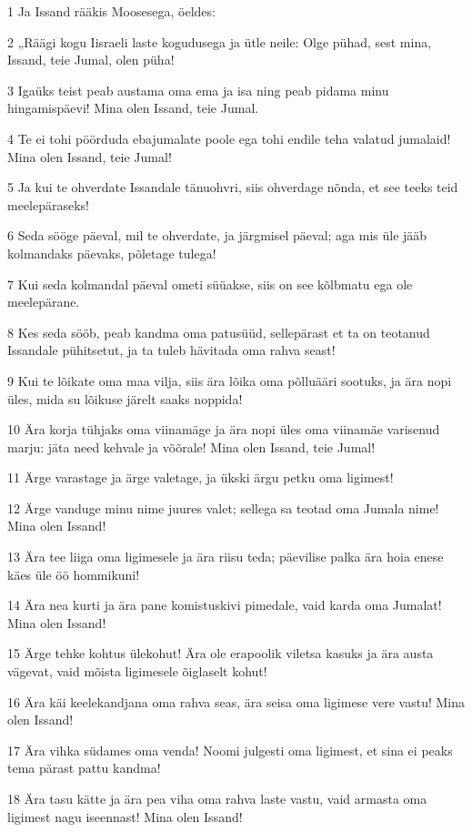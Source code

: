 \par 1 Ja Issand rääkis Moosesega, öeldes:
\par 2 „Räägi kogu Iisraeli laste kogudusega ja ütle neile: Olge pühad, sest mina, Issand, teie Jumal, olen püha!
\par 3 Igaüks teist peab austama oma ema ja isa ning peab pidama minu hingamispäevi! Mina olen Issand, teie Jumal.
\par 4 Te ei tohi pöörduda ebajumalate poole ega tohi endile teha valatud jumalaid! Mina olen Issand, teie Jumal!
\par 5 Ja kui te ohverdate Issandale tänuohvri, siis ohverdage nõnda, et see teeks teid meelepäraseks!
\par 6 Seda sööge päeval, mil te ohverdate, ja järgmisel päeval; aga mis üle jääb kolmandaks päevaks, põletage tulega!
\par 7 Kui seda kolmandal päeval ometi süüakse, siis on see kõlbmatu ega ole meelepärane.
\par 8 Kes seda sööb, peab kandma oma patusüüd, sellepärast et ta on teotanud Issandale pühitsetut, ja ta tuleb hävitada oma rahva seast!
\par 9 Kui te lõikate oma maa vilja, siis ära lõika oma põlluääri sootuks, ja ära nopi üles, mida su lõikuse järelt saaks noppida!
\par 10 Ära korja tühjaks oma viinamäge ja ära nopi üles oma viinamäe varisenud marju: jäta need kehvale ja võõrale! Mina olen Issand, teie Jumal!
\par 11 Ärge varastage ja ärge valetage, ja ükski ärgu petku oma ligimest!
\par 12 Ärge vanduge minu nime juures valet; sellega sa teotad oma Jumala nime! Mina olen Issand!
\par 13 Ära tee liiga oma ligimesele ja ära riisu teda; päevilise palka ära hoia enese käes üle öö hommikuni!
\par 14 Ära nea kurti ja ära pane komistuskivi pimedale, vaid karda oma Jumalat! Mina olen Issand!
\par 15 Ärge tehke kohtus ülekohut! Ära ole erapoolik viletsa kasuks ja ära austa vägevat, vaid mõista ligimesele õiglaselt kohut!
\par 16 Ära käi keelekandjana oma rahva seas, ära seisa oma ligimese vere vastu! Mina olen Issand!
\par 17 Ära vihka südames oma venda! Noomi julgesti oma ligimest, et sina ei peaks tema pärast pattu kandma!
\par 18 Ära tasu kätte ja ära pea viha oma rahva laste vastu, vaid armasta oma ligimest nagu iseennast! Mina olen Issand!
